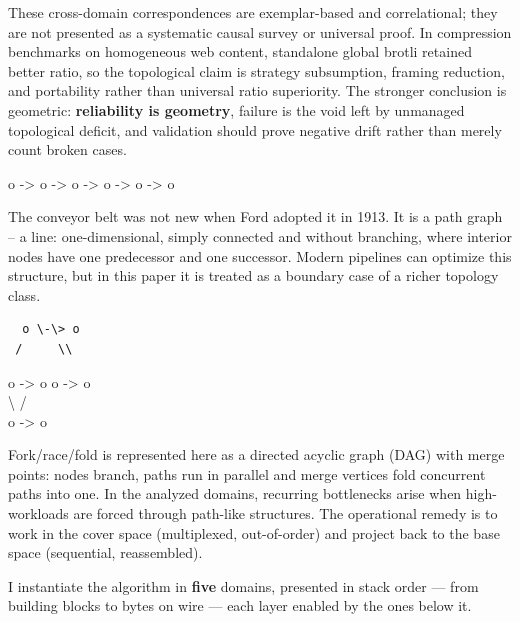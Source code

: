 \documentclass[
]{article}
\begin{document}
These cross-domain correspondences are exemplar-based and correlational;
they are not presented as a systematic causal survey or universal proof.
In compression benchmarks on homogeneous web content, standalone global
brotli retained better ratio, so the topological claim is strategy
subsumption, framing reduction, and portability rather than universal
ratio superiority. The stronger conclusion is geometric:
\textbf{reliability is geometry}, failure is the void left by unmanaged
topological deficit, and validation should prove negative drift rather
than merely count broken cases.

o -\textgreater{} o -\textgreater{} o -\textgreater{} o -\textgreater{}
o -\textgreater{} o

The conveyor belt was not new when Ford adopted it in 1913. It is a path
graph -- a line: one-dimensional, simply connected and without
branching, where interior nodes have one predecessor and one successor.
Modern pipelines can optimize this structure, but in this paper it is
treated as a boundary case of a richer topology class.

\begin{verbatim}
  o \-\> o  
 /     \\  
\end{verbatim}

o -\textgreater{} o o -\textgreater{} o\\
\textbackslash{} /\\
o -\textgreater{} o

Fork/race/fold is represented here as a directed acyclic graph (DAG)
with merge points: nodes branch, paths run in parallel and merge
vertices fold concurrent paths into one. In the analyzed domains,
recurring bottlenecks arise when high- workloads are forced through
path-like structures. The operational remedy is to work in the cover
space (multiplexed, out-of-order) and project back to the base space
(sequential, reassembled).

I instantiate the algorithm in \textbf{five} domains, presented in stack
order --- from building blocks to bytes on wire --- each layer enabled
by the ones below it.
\end{document}
